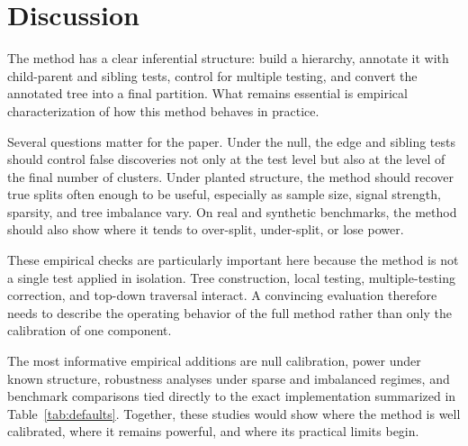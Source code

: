 
\section{Discussion}

The method has a clear inferential structure: build a hierarchy, annotate it
with child-parent and sibling tests, control for multiple testing, and convert
the annotated tree into a final partition. What remains essential is empirical
characterization of how this method behaves in practice.

Several questions matter for the paper. Under the null, the edge and
sibling tests should control false discoveries not only at the test level but
also at the level of the final number of clusters. Under planted structure,
the method should recover true splits often enough to be useful, especially as
sample size, signal strength, sparsity, and tree imbalance vary. On real and
synthetic benchmarks, the method should also show where it tends to over-split,
under-split, or lose power.

These empirical checks are particularly important here because the method is
not a single test applied in isolation. Tree construction, local testing,
multiple-testing correction, and top-down traversal interact. A convincing
evaluation therefore needs to describe the operating behavior of the full
method rather than only the calibration of one component.

The most informative empirical additions are null calibration, power under
known structure, robustness analyses under sparse and imbalanced regimes, and
benchmark comparisons tied directly to the exact implementation summarized in
Table~\ref{tab:defaults}. Together, these studies would show where the method
is well calibrated, where it remains powerful, and where its practical limits
begin.
